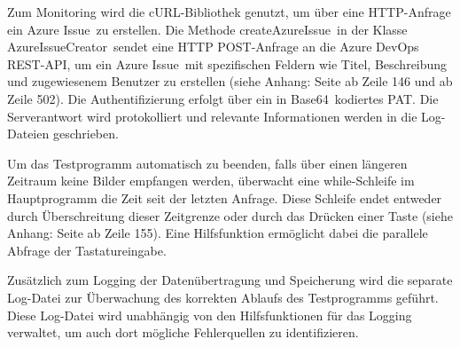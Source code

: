 Zum Monitoring wird die \glqq cURL\grqq-Bibliothek genutzt, um über eine HTTP-Anfrage ein \glqq Azure Issue\grqq\ zu erstellen. Die Methode \glqq createAzureIssue\grqq\
in der Klasse \glqq AzureIssueCreator\grqq\ sendet eine HTTP POST-Anfrage an die Azure DevOps REST-API, um ein \glqq Azure Issue\grqq\ mit spezifischen Feldern wie Titel, 
Beschreibung und zugewiesenem Benutzer zu erstellen (siehe Anhang: Seite \pageref{AzureIssueCreator1} ab Zeile 146 und \pageref{AzureIssueCreator2} ab Zeile 502). Die Authentifizierung erfolgt über ein in \glqq Base64\grqq\ kodiertes \ac{PAT}. Die Serverantwort wird protokolliert und 
relevante Informationen werden in die Log-Dateien geschrieben.

Um das Testprogramm automatisch zu beenden, falls über einen längeren Zeitraum keine Bilder empfangen werden, überwacht eine while-Schleife im Hauptprogramm die Zeit seit der letzten 
Anfrage. Diese Schleife endet entweder durch Überschreitung dieser Zeitgrenze oder durch das Drücken einer Taste (siehe Anhang: Seite \pageref{while-Schleife} ab Zeile 155). Eine Hilfsfunktion ermöglicht dabei die parallele Abfrage der 
Tastatureingabe.

Zusätzlich zum Logging der Datenübertragung und Speicherung wird die separate Log-Datei zur Überwachung des korrekten Ablaufs des Testprogramms geführt. Diese Log-Datei wird unabhängig 
von den Hilfsfunktionen für das Logging verwaltet, um auch dort mögliche Fehlerquellen zu identifizieren.
